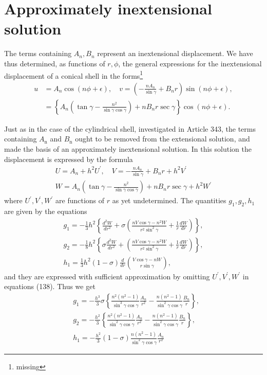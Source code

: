 \section{Approximately inextensional solution} %
The terms containing \(A_n, B_n\) represent an inextensional
displacement. We have thus determined, as functions of \(r, \phi\), the
general expressions for the inextensional displacement of a conical
shell in the forms\footnote{missing}
\[\begin{aligned}
u & =A_n \cos (n \phi+\epsilon), \quad v=\left(-\frac{n A_n}{\sin \gamma}+B_n r\right) \sin (n \phi+\epsilon), \\
& =\left\{A_n\left(\tan \gamma-\frac{n^2}{\sin \gamma \cos \gamma}\right)+n B_n r \sec \gamma\right\} \cos (n \phi+\epsilon) .
\end{aligned}\]

Just as in the case of the cylindrical shell, investigated in Article
343, the terms containing \(A_{\mathrm{n}}\) and \(B_{\mathrm{n}}\)
ought to be removed from the extensional solution, and made the basis of
an approximately inextensional solution. In this solution the
displacement is expressed by the formula
\[
\begin{array}{c}
U=A_n+h^2 U^{\prime}, \quad V=-\frac{n A_n}{\sin \gamma}+B_n r+h^2 V^{\prime} \\
W=A_n\left(\tan \gamma-\frac{n^2}{\sin \gamma \cos \gamma}\right)+n B_n r \sec \gamma+h^2 W^{\prime}
\end{array}
\]
where \(U^{\prime}, V^{\prime}, W^{\prime}\) are functions of \(r\) as
yet undetermined. The quantities \(g_1, g_2, h_1\) are given by the
equations
\[
\begin{array}{c}
g_1=-\frac{1}{3} h^2\left\{\frac{d^2 W}{d r^2}+\sigma\left(\frac{n V \cos \gamma-n^2 W}{r^2 \sin ^2 \gamma}+\frac{1}{r} \frac{d W}{d r}\right)\right\}, \\
g_2=-\frac{1}{8} h^2\left\{\sigma \frac{d^2 W}{d r^2}+\left(\frac{n V \cos \gamma-n^2 W}{r^2 \sin ^2 \gamma}+\frac{1}{r} \frac{d W}{d r}\right)\right\}, \\
h_1=\frac{1}{3} h^2(1-\sigma) \frac{d}{d r}\binom{V \cos \gamma-n W}{r \sin \gamma},
\end{array}
\]
and they are expressed with sufficient approximation by omitting
\(U^{\prime}, V^{\prime}, W^{\prime}\) in equations (138). Thus we get
\[\begin{aligned}
& g_1=-\frac{h^3}{3} \sigma\left\{\frac{n^2\left(n^2-1\right)}{\sin ^3 \gamma \cos \gamma} \frac{A_n}{r^2}-\frac{n\left(n^2-1\right)}{\sin ^2 \gamma \cos \gamma} \frac{B_n}{r}\right\}, \\
& g_2=-\frac{h^2}{3}\left\{\frac{n^2\left(n^2-1\right)}{\sin ^2 \gamma \cos \gamma} \frac{A_n}{r^2}-\frac{n\left(n^2-1\right)}{\sin ^2 \gamma \cos \gamma} \frac{B_n}{r}\right\}, \\
& h_1=-\frac{h^2}{3}(1-\sigma) \frac{n\left(n^2-1\right)}{\sin ^2 \gamma \cos \gamma} \frac{A_n}{r^2}
\end{aligned}\]

